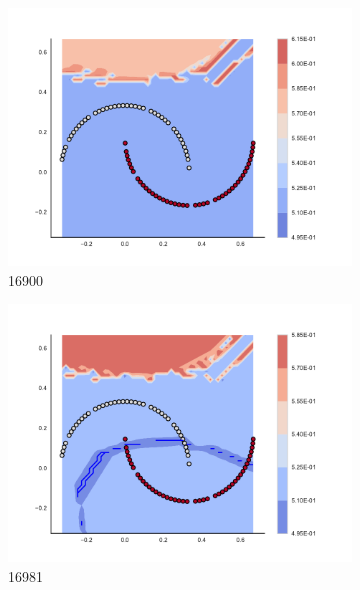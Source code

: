 \begin{figure}[h]
\begin{subfigure}[b]{0.09\textwidth}
    \includegraphics[clip, trim=2.35cm 1.75cm 4.5cm 0cm,width=\textwidth]{img/convergence/16900.pdf}
    \caption{16900}
    \label{fig:convergence_16900}
\end{subfigure}
%
\begin{subfigure}[b]{0.09\textwidth}
    \includegraphics[clip, trim=2.35cm 1.75cm 4.5cm 0cm,width=\textwidth]{img/convergence/16981.pdf}
    \caption{16981}
    \label{fig:convergence_16981}
\end{subfigure}
%
\begin{subfigure}[b]{0.09\textwidth}

\end{subfigure}
\end{figure}
